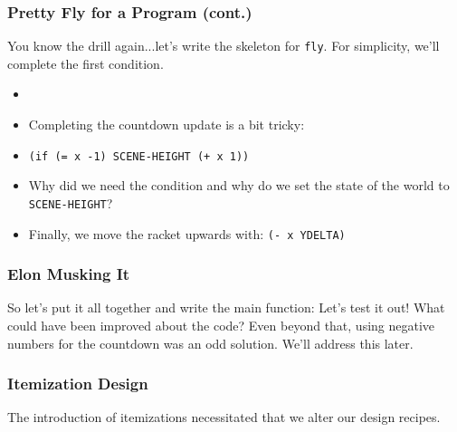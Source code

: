 \documentclass{beamer}
\begin{document}
\begin{frame}
  \frametitle{Pretty Fly for a Program (cont.)}
  You know the drill again...let's write the skeleton for
  \texttt{fly}. For simplicity, we'll complete the
  first condition.
  \begin{itemize}
  \item<2-> \flySkeleton
  \item<3-> Completing the countdown update is a bit tricky:
  \item<4-> \texttt{(if (= x -1) SCENE-HEIGHT (+ x 1))}
  \item<5-> Why did we need the condition and why do we set
    the state of the world to \texttt{SCENE-HEIGHT}?
  \item<6-> Finally, we move the racket upwards with:
    \texttt{(- x YDELTA)}
  \end{itemize}  
\end{frame}


\begin{frame}
  \frametitle{Elon Musking It}
  So let's put it all together and write the main function:
  \pause
  \main
  \pause
  Let's test it out!
  \pause
  What could have been improved about the code?
  \pause
  Even beyond that, using negative numbers for the countdown
  was an odd solution. We'll address this later.
\end{frame}

\begin{frame}
  \frametitle{Itemization Design}
  The introduction of itemizations necessitated that we alter
  our design recipes.
\end{frame}
\end{document}
